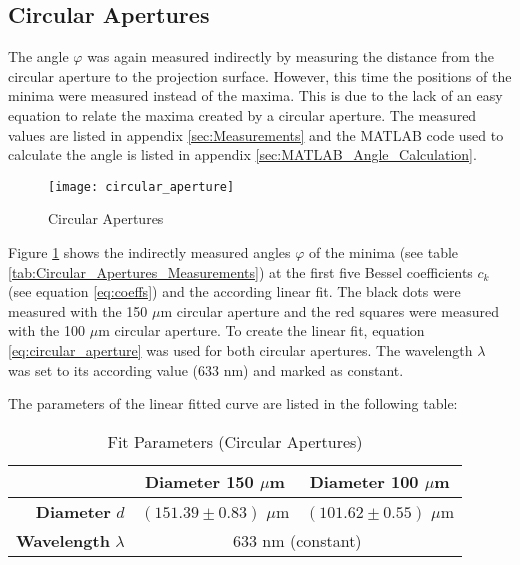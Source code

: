 \subsection{Circular Apertures}
\label{subsec:Circular_Apertures}
The angle $\varphi$ was again measured indirectly by measuring the distance from the circular aperture to the projection surface. However, this time the positions of the minima were measured instead of the maxima. This is due to the lack of an easy equation to relate the maxima created by a circular aperture. The measured values are listed in appendix \ref{sec:Measurements} and the MATLAB code used to calculate the angle is listed in appendix \ref{sec:MATLAB_Angle_Calculation}.
\begin{figure}[H]
	\centering
	\texttt{[image: circular\_aperture]}
	\caption{Circular Apertures}
	\label{fig:Circular_Apertures}
\end{figure}
Figure \ref{fig:Circular_Apertures} shows the indirectly measured angles $\varphi$ of the minima (see table \ref{tab:Circular_Apertures_Measurements}) at the first five Bessel coefficients $c_k$ (see equation \ref{eq:coeffs}) and the according linear fit. The black dots were measured with the 150 $\mu$m circular aperture and the red squares were measured with the 100 $\mu$m circular aperture. To create the linear fit, equation \ref{eq:circular_aperture} was used for both circular apertures. The wavelength $\lambda$ was set to its according value (633 nm) and marked as constant.

The parameters of the linear fitted curve are listed in the following table:
\begin{table}[H]
	\centering
	\renewcommand{\arraystretch}{1.3}
	\begin{tabular}{r|c c}
		& \textbf{Diameter 150 $\mu$m} & \textbf{Diameter 100 $\mu$m} \\
		\hline\hline
		\textbf{Diameter} $d$ & $(151.39\pm0.83)$ $\mu$m & $(101.62\pm0.55)$ $\mu$m \\		
		\textbf{Wavelength} $\lambda$ & \multicolumn{2}{c}{633 nm (constant)}
	\end{tabular}
	\caption{Fit Parameters (Circular Apertures)}
	\label{tab:Circular_Apertures}
\end{table}
\newpage
